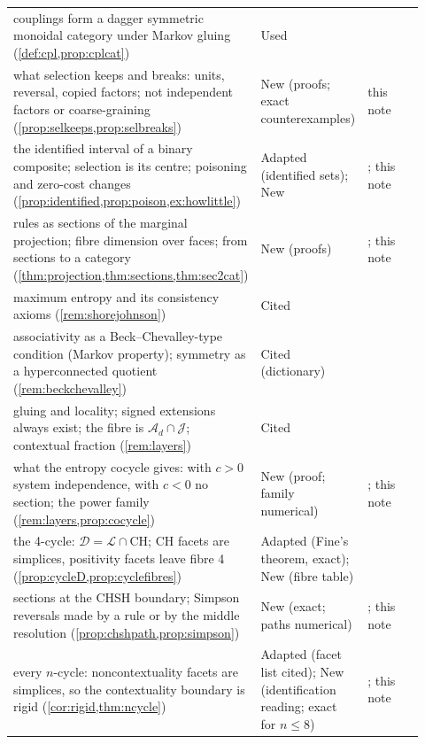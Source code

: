\documentclass[11pt]{article}
\theoremstyle{definition}\newtheorem{definition}[theorem]{Definition}\newtheorem{remark}[theorem]{Remark}\newtheorem{example}[theorem]{Example}\newtheorem{problem}[theorem]{Open problem}\crefname{problem}{Problem}{Problems}
\begin{document}
{\begin{longtable}{p{0.46\linewidth}p{0.16\linewidth}p{0.3\linewidth}}
\rowcolor{stUsed} couplings form a dagger symmetric monoidal category under Markov gluing (\cref{def:cpl,prop:cplcat}) & Used & \cite{Fritz2020,ChoJacobs2019}\\
\rowcolor{stNew} what selection keeps and breaks: units, reversal, copied factors; not independent factors or coarse-graining (\cref{prop:selkeeps,prop:selbreaks}) & New (proofs; exact counterexamples) & this note\\
\rowcolor{stAdapted} the identified interval of a binary composite; selection is its centre; poisoning and zero-cost changes (\cref{prop:identified,prop:poison,ex:howlittle}) & Adapted (identified sets); New & \cite{Manski2003}; this note\\
\rowcolor{stNew} rules as sections of the marginal projection; fibre dimension over faces; from sections to a category (\cref{thm:projection,thm:sections,thm:sec2cat}) & New (proofs) & \cite{WalkupWets1969,BilleraSturmfels1992}; this note\\
\rowcolor{stCited} maximum entropy and its consistency axioms (\cref{rem:shorejohnson}) & Cited & \cite{ShoreJohnson1980,Uffink1995}\\
\rowcolor{stCited} associativity as a Beck--Chevalley-type condition (Markov property); symmetry as a hyperconnected quotient (\cref{rem:beckchevalley}) & Cited (dictionary) & \cite{Fritz2020,Hora2023}\\
\rowcolor{stCited} gluing and locality; signed extensions always exist; the fibre is $\mathcal A_d\cap\mathcal J$; contextual fraction (\cref{rem:layers}) & Cited & \cite{AbramskyBrandenburger2011,AlSafiShort2013,AbramskyBarbosaMansfield2017}\\
\rowcolor{stNew} what the entropy cocycle gives: with $c>0$ system independence, with $c<0$ no section; the power family (\cref{rem:layers,prop:cocycle}) & New (proof; family numerical) & \cite{BaudotBennequin2015,Vigneaux2020,CressieRead1984}; this note\\
\rowcolor{stAdapted} the 4-cycle: $\mathcal D=\mathcal L\cap\mathrm{CH}$; CH facets are simplices, positivity facets leave fibre 4 (\cref{prop:cycleD,prop:cyclefibres}) & Adapted (Fine's theorem, exact); New (fibre table) & \cite{Fine1982,ClauserHorne1974,AbramskyBrandenburger2011}\\
\rowcolor{stNew} sections at the CHSH boundary; Simpson reversals made by a rule or by the middle resolution (\cref{prop:chshpath,prop:simpson}) & New (exact; paths numerical) & \cite{Simpson1951}; this note\\
\rowcolor{stAdapted} every $n$-cycle: noncontextuality facets are simplices, so the contextuality boundary is rigid (\cref{cor:rigid,thm:ncycle}) & Adapted (facet list cited); New (identification reading; exact for $n\le8$) & \cite{AraujoEtAl2013}; this note\\

\end{longtable}}
\end{document}
